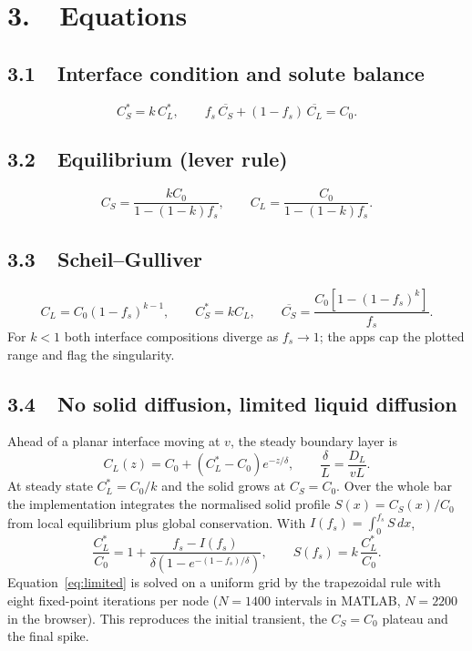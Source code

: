 \documentclass[11pt,a4paper]{article}
\begin{document}
\section*{3.\ \ Equations}

\subsection*{3.1\ \ Interface condition and solute balance}
\begin{equation}
C_S^*=k\,C_L^*,
\qquad
f_s\,\overline{C_S}+(1-f_s)\,\overline{C_L}=C_0.
\label{eq:balance}
\end{equation}

\subsection*{3.2\ \ Equilibrium (lever rule)}
\begin{equation}
C_S=\frac{kC_0}{1-(1-k)f_s},
\qquad
C_L=\frac{C_0}{1-(1-k)f_s}.
\label{eq:lever}
\end{equation}

\subsection*{3.3\ \ Scheil--Gulliver}
\begin{equation}
C_L=C_0(1-f_s)^{k-1},
\qquad
C_S^*=kC_L,
\qquad
\overline{C_S}=\frac{C_0\left[1-(1-f_s)^k\right]}{f_s}.
\label{eq:scheil}
\end{equation}
For $k<1$ both interface compositions diverge as $f_s\to1$; the apps cap the
plotted range and flag the singularity.

\subsection*{3.4\ \ No solid diffusion, limited liquid diffusion}
Ahead of a planar interface moving at $v$, the steady boundary layer is
\begin{equation}
C_L(z)=C_0+\left(C_L^*-C_0\right)e^{-z/\delta},
\qquad
\frac{\delta}{L}=\frac{D_L}{vL}.
\label{eq:boundary}
\end{equation}
At steady state $C_L^*=C_0/k$ and the solid grows at $C_S=C_0$. Over the whole
bar the implementation integrates the normalised solid profile
$S(x)=C_S(x)/C_0$ from local equilibrium plus global conservation. With
$I(f_s)=\int_0^{f_s}S\,dx$,
\begin{equation}
\frac{C_L^*}{C_0}=1+\frac{f_s-I(f_s)}
{\delta\left(1-e^{-(1-f_s)/\delta}\right)},
\qquad
S(f_s)=k\,\frac{C_L^*}{C_0}.
\label{eq:limited}
\end{equation}
Equation~\eqref{eq:limited} is solved on a uniform grid by the trapezoidal rule
with eight fixed-point iterations per node ($N=1400$ intervals in MATLAB,
$N=2200$ in the browser). This reproduces the initial transient, the
$C_S=C_0$ plateau and the final spike.
\end{document}
